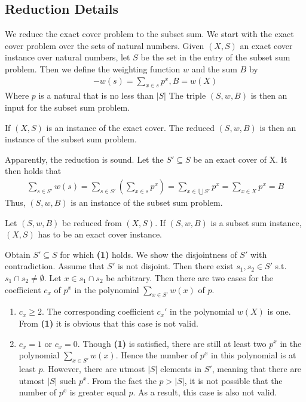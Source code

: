 \subsection{Reduction Details}
We reduce the exact cover problem to the subset sum. We start with the exact cover problem over the sets of natural numbers. 
Given $(X, S)$ an exact cover instance over natural numbers, let $S$ be the set in the entry of the subset sum problem. Then we
define the weighting function $w$ and the sum $B$ by 
\begin{align*}-
    w(s) = \sum_{x \in s} p^x , B = w(X)
\end{align*}
Where $p$ is a natural that is no less than $|S|$
The triple $(S, w, B)$ is then an input for the subset sum problem.
\begin{lemma}[Soundness]
    If $(X, S)$ is an instance of the exact cover. The reduced $(S, w, B)$ is then an instance of the subset sum problem. 
\end{lemma}
Apparently, the reduction is sound. Let the $S' \subseteq S$ be an exact cover of X. It then holds that
\begin{align*}
    \sum_{s \in S'} w(s) = \sum_{s \in S'} (\sum_{x \in s} p^x) = \sum_{x \in \bigcup S'} p^x = \sum_{x \in X} p^x = B
\end{align*}
Thus, $(S, w, B)$ is an instance of the subset sum problem. 
\begin{lemma}[Completeness]
    Let $(S, w, B)$ be reduced from $(X, S)$. If $(S, w, B)$ is a subset sum instance, $(X, S)$ has to be an exact cover instance. 
\end{lemma}
Obtain $S' \subseteq S$ for which \textbf{(1)} holds. We show the disjointness of $S'$ with contradiction. 
Assume that $S'$ is not disjoint. Then there exist $s_1, s_2 \in S'$ s.t. $s_1 \cap s_2 \not= \emptyset$. Let $x \in s_1 \cap s_2$ be arbitrary. Then 
there are two cases for the coefficient $c_x$ of $p^x$ in the polynomial $\sum_{x \in S'} w(x)$ of $p$. 
\begin{enumerate}
    \item $c_x \geq 2$. The corresponding coefficient $c_x'$ in the polynomial $w(X)$ is one. From \textbf{(1)} it is obvious that this case is not valid.
    \item $c_x = 1$ or $c_x = 0$. Though \textbf{(1)} is satisfied, there are still at least two $p^x$ in the polynomial $\sum_{x \in S'} w(x)$.
    Hence the number of $p^x$ in this polynomial is at least $p$. However, there are utmost $|S|$ elements in $S'$, meaning that there are utmost $|S|$ such $p^x$. From the 
    fact the $p > |S|$, it is not possible that the number of $p^x$ is greater equal $p$. As a result, this case is also not valid.
\end{enumerate}
